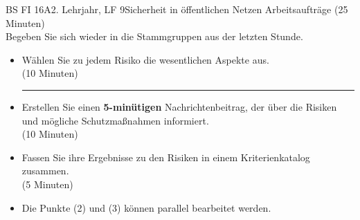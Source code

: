 \documentclass[oneside,openany,headings=optiontotoc,11pt,numbers=noenddot]{scrreprt}
\begin{document}
\begin{worksheet}{BS FI 16A}{2. Lehrjahr, LF 9}{Sicherheit in öffentlichen Netzen}
		\color{codegray}Arbeitsaufträge (25 Minuten)\\
		\color{black}
		Begeben Sie sich wieder in die Stammgruppen aus der letzten Stunde.
		\begin{itemize}
			\item[(1)] Wählen Sie zu jedem Risiko die wesentlichen Aspekte aus.\\ (10 Minuten)\\
			\hrule
			\item[(2)]Erstellen Sie einen \textbf{5-minütigen} Nachrichtenbeitrag, der über die Risiken und mögliche Schutzmaßnahmen informiert.\\(10 Minuten)
			\item[(3)] Fassen Sie ihre Ergebnisse zu den Risiken in einem Kriterienkatalog zusammen.\\ (5 Minuten)
			\item[] \tiny Die Punkte (2) und (3) können parallel bearbeitet werden.
		\end{itemize}
	\end{worksheet}
\end{document}
